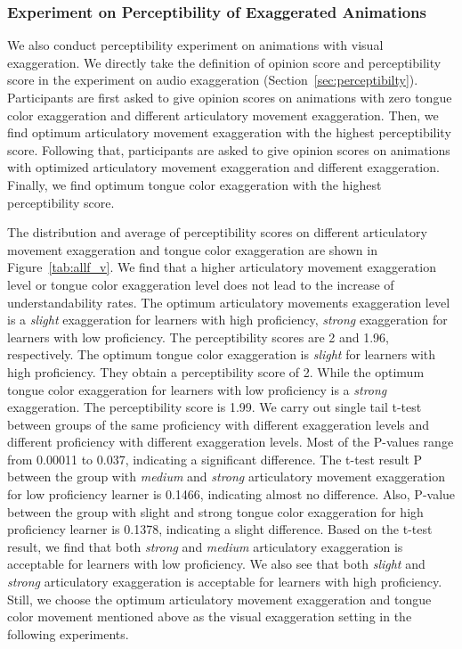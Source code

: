 \documentclass[sigconf]{acmart}
\begin{document}
\subsubsection{Experiment on Perceptibility of Exaggerated Animations}
\label{sec:visual_test}
We also conduct perceptibility experiment on animations with visual exaggeration. %
We directly take the definition of opinion score and perceptibility score in the experiment on audio exaggeration (Section~\ref{sec:perceptibilty}).
%
Participants are first asked to give opinion scores on animations with zero tongue color exaggeration and different articulatory movement exaggeration. 
%
Then, we find optimum articulatory movement exaggeration with the highest perceptibility score. %
Following that, participants are asked to give opinion scores on animations with optimized articulatory movement exaggeration and different exaggeration. %
Finally, we find optimum tongue color exaggeration with the highest perceptibility score. %


The distribution and average of perceptibility scores on different articulatory movement exaggeration and tongue color exaggeration are shown in Figure~\ref{tab:allf_v}. %
We find that a higher articulatory movement exaggeration level or tongue color exaggeration level does not lead to the increase of understandability rates. %
The optimum articulatory movements exaggeration level is a \textit{slight} exaggeration for learners with high proficiency, \textit{strong} exaggeration for learners with low proficiency. %
The perceptibility scores are 2 and 1.96, respectively. %
The optimum tongue color exaggeration is \textit{slight} for learners with high proficiency. They obtain a perceptibility score of 2. %
While the optimum tongue color exaggeration for learners with low proficiency is a \textit{strong} exaggeration. The perceptibility score is 1.99. %
We carry out single tail t-test between groups of the same proficiency with different exaggeration levels and different proficiency with different exaggeration levels. %
Most of the P-values range from 0.00011 to 0.037, indicating a significant difference. %
The t-test result P between the group with \textit{medium} and \textit{strong} articulatory movement exaggeration for low proficiency learner is 0.1466, indicating almost no difference. %
Also, P-value between the group with slight and strong tongue color exaggeration for high proficiency learner is 0.1378, indicating a slight difference. %
Based on the t-test result, we find that both \textit{strong} and \textit{medium} articulatory exaggeration is acceptable for learners with low proficiency. %
We also see that both \textit{slight} and \textit{strong} articulatory exaggeration is acceptable for learners with high proficiency. %
Still, we choose the optimum articulatory movement exaggeration and tongue color movement mentioned above as the visual exaggeration setting in the following experiments. %
\end{document}

